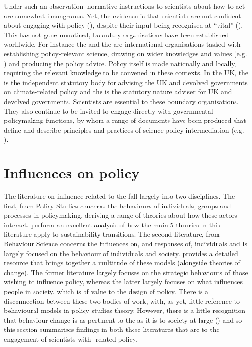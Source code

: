Under such an observation, normative instructions to scientists about how to act are somewhat incongruous. Yet, the evidence is that scientists are not confident about engaging with policy (\cite{KEU2021perceptions}), despite their input being recognised at ``vital'' (\cite{KennyRHTB2017}). This has not gone unnoticed, \SPI{} boundary organisations have been established worldwide. For instance the \IPCC{} and the \IPBES{} are international organisations tasked with establishing policy-relevant science, drawing on wider knowledges and values (e.g. \cite{PascualEtAl2018,MatukBSAHT2020})  and producing the policy advice. Policy itself is made nationally and locally, requiring the relevant knowledge to be convened in these contexts. In the UK, the \CCC{} is the independent statutory body for advising the UK and devolved governments on climate-related policy and the \JNCC{} is the statutory nature adviser for UK and devolved governments. Scientists are essential to these boundary organisations. They also continue to be invited to engage directly with governmental policymaking functions, by whom a range of documents have been produced that define and describe principles and practices of science-policy intermediation (e.g. \cite{OECD2015,DottiACDMPSVW2024,KarkkainenLKK2024}). 

\section{Influences on policy}\label{sec:litinfluence}

The literature on influence related to the \SPI{} fall largely into two disciplines. The first, from Policy Studies concerns the behaviours of individuals, groups and processes in policymaking, deriving a range of theories about how these actors interact. \textcite{KernR2018} perform an excellent analysis of how the main 5 theories in this literature apply to sustainability transitions. The second literature, from Behaviour Science concerns the influences on, and responses of, individuals and is largely focused on the behaviour of individuals and society. \textcite{Darnton2008} provides a detailed resource that brings together a multitude of these models (alongside theories of change). The former literature largely focuses on the strategic behaviours of those wishing to influence policy, whereas the latter largely focuses on what influences people in society, which is of value to the design of policy. There is a disconnection between these two bodies of work, with, as yet, little reference to behavioural models in policy studies theory. However, there is a little recognition that behaviour change is as pertinent to the \SPI{} as it is to society at large (\cite{CairneyW2017}) and so this section summarises findings in both these literatures that are to the engagement of scientists with \CAN-related policy.

